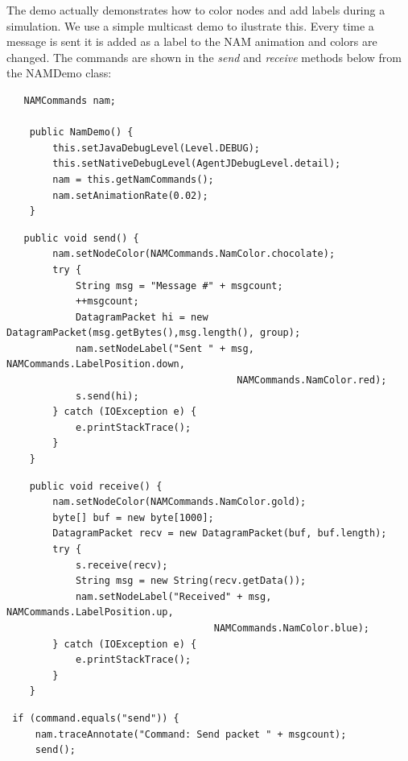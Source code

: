  The demo actually demonstrates how to color nodes and add labels during a simulation. We use a simple multicast demo to ilustrate this. Every time a message is sent it is added as a label to the NAM animation and colors are changed. The commands are shown in the \emph{send} and \emph{receive} methods below from the NAMDemo class:

 
 \footnotesize
 \begin{verbatim}
   NAMCommands nam;

    public NamDemo() {
        this.setJavaDebugLevel(Level.DEBUG);
        this.setNativeDebugLevel(AgentJDebugLevel.detail);
        nam = this.getNamCommands();
        nam.setAnimationRate(0.02);
    }
 \end{verbatim}
 \normalsize

\footnotesize
 \begin{verbatim}
   public void send() {
        nam.setNodeColor(NAMCommands.NamColor.chocolate);
        try {
            String msg = "Message #" + msgcount;
            ++msgcount;
            DatagramPacket hi = new DatagramPacket(msg.getBytes(),msg.length(), group);
            nam.setNodeLabel("Sent " + msg, NAMCommands.LabelPosition.down, 
            							NAMCommands.NamColor.red);
            s.send(hi);
        } catch (IOException e) {
            e.printStackTrace();  
        }
    } 
 \end{verbatim}
 \normalsize

\footnotesize
 \begin{verbatim}
    public void receive() {
        nam.setNodeColor(NAMCommands.NamColor.gold);
        byte[] buf = new byte[1000];
        DatagramPacket recv = new DatagramPacket(buf, buf.length);
        try {
            s.receive(recv);
            String msg = new String(recv.getData());
            nam.setNodeLabel("Received" + msg, NAMCommands.LabelPosition.up, 
            						NAMCommands.NamColor.blue);
        } catch (IOException e) {
            e.printStackTrace(); 
        }
    }
 \end{verbatim}
 \normalsize
 
 \footnotesize
 \begin{verbatim}
 if (command.equals("send")) {
     nam.traceAnnotate("Command: Send packet " + msgcount);
     send();
 \end{verbatim}
 \normalsize



